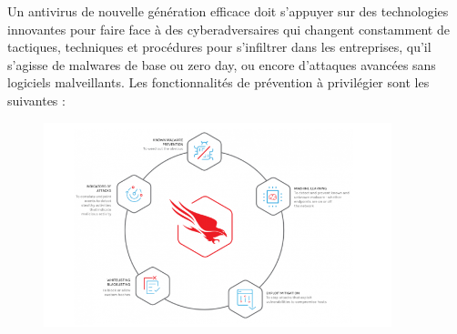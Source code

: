 Un antivirus de nouvelle génération efficace doit s’appuyer sur des technologies innovantes pour faire face à des cyberadversaires qui changent constamment de tactiques, techniques et procédures pour s’infiltrer dans les entreprises, qu’il s’agisse de malwares de base ou zero day, ou encore d’attaques avancées sans logiciels malveillants. Les fonctionnalités de prévention à privilégier sont les suivantes :
\begin{center}
\begin{figure}[h]
	\hbox{\includegraphics[width=0.9\textwidth]{PhotoMemoire/newgenerationanti.png}}
	\caption{ }
\end{figure}
\end{center}
